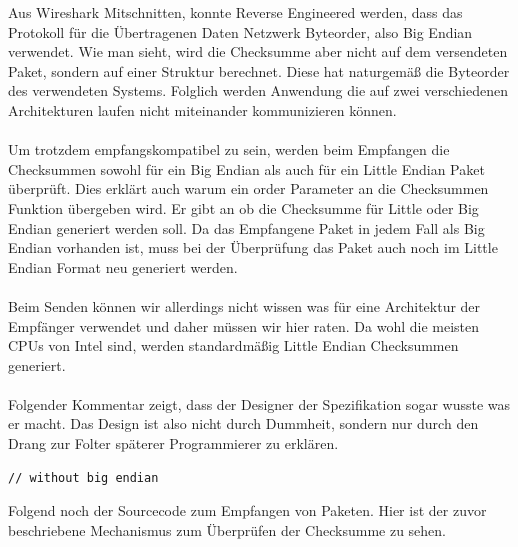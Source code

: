 Aus Wireshark Mitschnitten, konnte Reverse Engineered werden, dass das Protokoll für die Übertragenen Daten Netzwerk Byteorder,
also Big Endian verwendet. Wie man sieht, wird die Checksumme aber nicht auf dem versendeten Paket, sondern auf
einer Struktur berechnet. Diese hat naturgemäß die Byteorder des verwendeten Systems.
Folglich werden Anwendung die auf zwei verschiedenen Architekturen laufen nicht miteinander kommunizieren können.
\\\\
Um trotzdem empfangskompatibel zu sein, werden beim Empfangen die Checksummen sowohl für ein Big Endian
als auch für ein Little Endian Paket überprüft. Dies erklärt auch warum ein
order Parameter an die Checksummen Funktion übergeben wird. Er gibt an ob die Checksumme
für Little oder Big Endian generiert werden soll. 
Da das Empfangene Paket in jedem Fall als Big Endian vorhanden ist, muss bei der Überprüfung das Paket auch noch
im Little Endian Format neu generiert werden.
\\\\
Beim Senden können wir allerdings nicht wissen was für eine Architektur der Empfänger verwendet und daher müssen wir hier raten. Da wohl die meisten CPUs von Intel sind, werden standardmäßig Little Endian Checksummen generiert.
\\\\
Folgender Kommentar zeigt, dass der Designer der Spezifikation sogar wusste was er macht. Das Design ist also nicht durch Dummheit, sondern nur durch den Drang zur Folter späterer Programmierer zu erklären. 
\begin{lstlisting}
// without big endian
\end{lstlisting}

Folgend noch der Sourcecode zum Empfangen von Paketen. Hier ist der zuvor beschriebene Mechanismus zum Überprüfen der Checksumme zu sehen.

